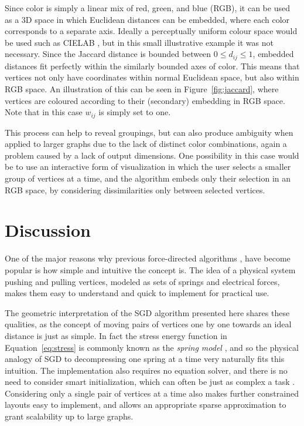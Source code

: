 Since color is simply a linear mix of red, green, and blue (RGB), it can be used as a 3D space in which Euclidean distances can be embedded, where each color corresponds to a separate axis. Ideally a perceptually uniform colour space would be used such as CIELAB \citep{Smart2019}, but in this small illustrative example it was not necessary.
Since the Jaccard distance is bounded between $0\leq d_{ij}\leq 1$, embedded distances fit perfectly within the similarly bounded axes of color. This means that vertices not only have coordinates within normal Euclidean space, but also within RGB space. 
An illustration of this can be seen in Figure~\ref{fig:jaccard}, where vertices are coloured according to their (secondary) embedding in RGB space. Note that in this case $w_{ij}$ is simply set to one.

This process can help to reveal groupings, but can also produce ambiguity when applied to larger graphs due to the lack of distinct color combinations, again a problem caused by a lack of output dimensions. One possibility in this case would be to use an interactive form of visualization in which the user selects a smaller group of vertices at a time, and the algorithm embeds only their selection in an RGB space, by considering dissimilarities only between selected vertices.

\section{Discussion}
One of the major reasons why previous force-directed algorithms \citep{Eades1984,Kamada1989,Fruchterman1991,Frick1995},
have become popular is how simple and intuitive the concept is. The idea of a physical system pushing and pulling vertices, modeled as sets of springs and electrical forces, makes them easy to understand and quick to implement for practical use.

The geometric interpretation of the SGD algorithm presented here shares these qualities, as the concept of moving pairs of vertices one by one towards an ideal distance is just as simple.
In fact the stress energy function in Equation~\eqref{eq:stress} is commonly known as the \emph{spring model} \citep{Kamada1989,Hu2005}, and so the physical analogy of SGD to decompressing one spring at a time very naturally fits this intuition.
The implementation also requires no equation solver, and there is no need to consider smart initialization, which can often be just as complex a task \citep{Brandes2008}.
Considering only a single pair of vertices at a time also makes further constrained layouts easy to implement, and allows an appropriate sparse approximation to grant scalability up to large graphs.

